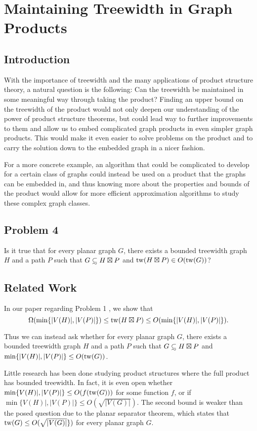 \documentclass[../main.tex]{subfiles}
\begin{document}
	
	\section{Maintaining Treewidth in Graph Products}
	\subsection{Introduction}
	With the importance of treewidth and the many applications of product structure theory, a natural question is the following: Can the treewidth be maintained in some meaningful way through taking the product? Finding an upper bound on the treewidth of the product would not only deepen our understanding of the power of product structure theorems, but could lead way to further improvements to them and allow us to embed complicated graph products in even simpler graph products. This would make it even easier to solve problems on the product and to carry the solution down to the embedded graph in a nicer fashion. 
	
	For a more concrete example, an algorithm that could be complicated to develop for a certain class of graphs could instead be used on a product that the graphs can be embedded in, and thus knowing more about the properties and bounds of the product would allow for more efficient approximation algorithms to study these complex graph classes.
	\subsection{Problem 4}
	  Is it true that for every planar graph $G$, there exists a bounded treewidth graph $H$ and a path $P$ such that $G \subsetsim H\boxtimes P$ and $\operatorname{tw}(H\boxtimes P) \in O(\operatorname{tw}(G))$? 
	
	\subsection{Related Work}
	In our paper regarding Problem 1 \cite[Lemma~3, Equation~(2)]{DMWW24}, we show that $$\Omega(\min\{|V(H)|,|V(P)|\})\leq  \operatorname{tw}( H\boxtimes P) \leq O(\min\{|V(H)|,|V(P)|\}).$$ 
	
	Thus we can instead ask whether for every planar graph $G$, there exists a bounded treewidth graph $H$ and a path $P$ such that $G\subsetsim H\boxtimes P$ and $\min\{|V(H)|,|V(P)|\} \leq O(\operatorname{tw}(G))$. 
	
	Little research has been done studying product structures where the full product has bounded treewidth. In fact, it is even open whether $\min\{V(H)|,|V(P)|\} \leq O(f(\operatorname{tw}(G)))$ for some function $f$, or if $\min\{V(H)|,|V(P)|\} \leq O(\sqrt{|V(G)|})$. The second bound is weaker than the posed question due to the planar separator theorem\cite{LT79}, which states that $\operatorname{tw}(G) \le O(\sqrt{|V(G)|}\})$ for every planar graph $G$.
	
	
	
\end{document}
